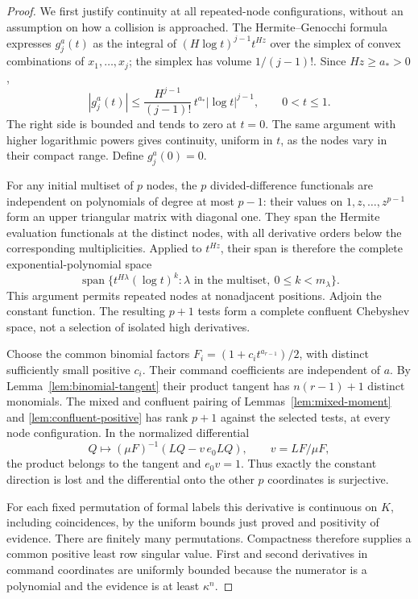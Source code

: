 \documentclass[11pt]{amsart}
\theoremstyle{definition}\newtheorem{definition}[theorem]{Definition}
\theoremstyle{remark}\newtheorem{remark}[theorem]{Remark}
\DeclareMathOperator{\spanop}{span}\DeclareMathOperator{\rank}{rank}
\begin{document}
\begin{proof}
We first justify continuity at all repeated-node configurations, without
an assumption on how a collision is approached. The Hermite--Genocchi
formula \cite{deBoor} expresses $g_j^a(t)$ as the integral of
$(H\log t)^{j-1}t^{Hz}$ over the simplex of convex combinations of
$x_1,\ldots,x_j$; the simplex has volume $1/(j-1)!$.
Since $Hz\ge a_*>0$,
\[
 |g_j^a(t)|\le
  \frac{H^{j-1}}{(j-1)!}\,t^{a_*}|\log t|^{j-1},
 \qquad 0<t\le1.
\]
The right side is bounded and tends to zero at $t=0$. The same argument
with higher logarithmic powers gives continuity, uniform in $t$, as the
nodes vary in their compact range. Define $g_j^a(0)=0$.

For any initial multiset of $p$ nodes, the $p$ divided-difference
functionals are independent on polynomials of degree at most $p-1$:
their values on $1,z,\ldots,z^{p-1}$ form an upper triangular matrix
with diagonal one. They span the Hermite evaluation functionals at the
distinct nodes, with all derivative orders below the corresponding
multiplicities. Applied to $t^{Hz}$, their span is therefore the complete
exponential-polynomial space
\[
 \spanop\{t^{H\lambda}(\log t)^k:
          \lambda\text{ in the multiset},\ 0\le k<m_\lambda\}.
\]
This argument permits repeated nodes at nonadjacent positions. Adjoin the
constant function. The resulting $p+1$ tests form a complete confluent
Chebyshev space, not a selection of isolated high derivatives.

Choose the common binomial factors
$F_i=(1+c_it^{a_{r-1}})/2$, with distinct sufficiently small positive
$c_i$. Their command coefficients are independent of $a$. By
Lemma~\ref{lem:binomial-tangent} their product tangent has
$n(r-1)+1$ distinct monomials. The mixed and confluent pairing of
Lemmas~\ref{lem:mixed-moment} and \ref{lem:confluent-positive} has
rank $p+1$ against the selected tests, at every node configuration.
In the normalized differential
\[
 Q\longmapsto(\mu F)^{-1}(LQ-v\,e_0LQ),
 \qquad v=LF/\mu F,
\]
the product belongs to the tangent and $e_0v=1$. Thus exactly the
constant direction is lost and the differential onto the other $p$
coordinates is surjective.

For each fixed permutation of formal labels this derivative is continuous
on $K$, including coincidences, by the uniform bounds just proved and
positivity of evidence. There are finitely many permutations. Compactness
therefore supplies a common positive least row singular value. First and
second derivatives in command coordinates are uniformly bounded because
the numerator is a polynomial and the evidence is at least $\kappa^n$.


\end{proof}
\end{document}
